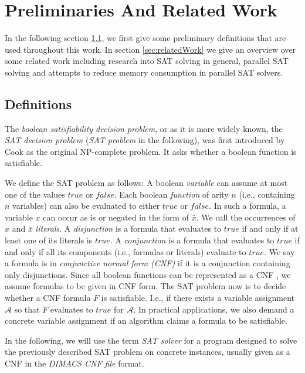 \documentclass[12pt,a4paper,twoside]{scrartcl}
\numberwithin{equation}{section}
\begin{document}
\newpage
\section{Preliminaries And Related Work}
\label{sec:preliminaries}

In the following section \ref{sec:definitions}, we first give some preliminary definitions that are used throughout this work. In section \ref{sec:relatedWork} we give an overview over some related work including research into SAT solving in general, parallel SAT solving and attempts to reduce memory consumption in parallel SAT solvers.

\subsection{Definitions}
\label{sec:definitions}

The \textit{boolean satisfiability decision problem}, or as it is more widely known, the \textit{SAT decision problem} (\textit{SAT problem} in the following), was first introduced by Cook \cite{satProblem} as the original NP-complete problem. It asks whether a boolean function is satisfiable.

We define the SAT problem as follows:
A boolean \textit{variable} can assume at most one of the values $true$ or $false$. Each boolean \textit{function} of arity $n$ (i.e., containing $n$ variables) can also be evaluated to either $true$ or $false$. In such a formula, a variable $x$ can occur as is or negated in the form of $\bar{x}$. We call the occurrences of $x$ and $\bar{x}$ \textit{literals}. A \textit{disjunction} is a formula that evaluates to $true$ if and only if at least one of its literals is $true$. A \textit{conjunction} is a formula that evaluates to $true$ if and only if all its components (i.e., formulas or literals) evaluate to $true$. We say a formula is in \textit{conjunctive normal form (CNF)} if it is a conjunction containing only disjunctions. Since all boolean functions can be represented as a CNF \cite{cnfPaper}, we assume formulas to be given in CNF form. 
The SAT problem now is to decide whether a CNF formula $F$ is satisfiable. I.e., if there exists a variable assignment $\mathcal{A}$ so that $F$ evaluates to $true$ for $\mathcal{A}$. In practical applications, we also demand a concrete variable assignment if an algorithm claims a formula to be satisfiable.

In the following, we will use the term \textit{SAT solver} for a program designed to solve the previously described SAT problem on concrete instances, usually given as a CNF in the \textit{DIMACS CNF file} format.
\end{document}
